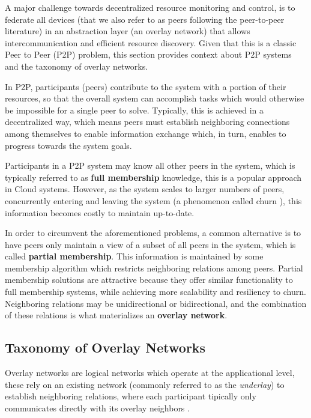 

A major challenge towards decentralized resource monitoring and control, is to federate all devices (that we also refer to as peers following the peer-to-peer literature) in an abstraction layer (an overlay network) that allows intercommunication and efficient resource discovery. Given that this is a classic Peer to Peer (P2P) problem, this section provides context about P2P systems and the taxonomy of overlay networks.

In P2P, participants (peers) contribute to the system with a portion of their resources, so that the overall system can accomplish tasks which would otherwise be impossible for a single peer to solve. Typically, this is achieved in a decentralized way, which means peers must establish neighboring connections among themselves to enable information exchange which, in turn, enables to progress towards the system goals. 

Participants in a P2P system may know all other peers in the system, which is typically referred to as \textbf{full membership} knowledge, this is a popular approach in Cloud systems. However, as the system scales to larger numbers of peers, concurrently entering and leaving the system (a phenomenon called churn \cite{stutzbach2006understanding}), this information becomes costly to maintain up-to-date. 

In order to circumvent the aforementioned problems, a common alternative is to have peers only maintain a view of a subset of all peers in the system, which is called \textbf{partial membership}. This information is maintained by some membership algorithm which restricts neighboring relations among peers. Partial membership solutions are attractive because they offer similar functionality to full membership systems, while achieving more scalability and resiliency to churn. Neighboring relations may be unidirectional or bidirectional, and the combination of these relations is what materializes an \textbf{overlay network}.

\subsection{Taxonomy of Overlay Networks}

Overlay networks are logical networks which operate at the applicational level, these rely on an existing network (commonly referred to as the \textit{underlay}) to establish neighboring relations, where each participant tipically only communicates directly with its overlay neighbors \cite{leitaoPHDthesis}. 

